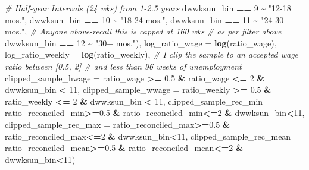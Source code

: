 \documentclass[
]{article}
\newenvironment{Shaded}{\begin{snugshade}}{\end{snugshade}}
\newcommand{\AttributeTok}[1]{\textcolor[rgb]{0.13,0.29,0.53}{#1}}
\newcommand{\CommentTok}[1]{\textcolor[rgb]{0.56,0.35,0.01}{\textit{#1}}}
\newcommand{\DecValTok}[1]{\textcolor[rgb]{0.00,0.00,0.81}{#1}}
\newcommand{\FloatTok}[1]{\textcolor[rgb]{0.00,0.00,0.81}{#1}}
\newcommand{\FunctionTok}[1]{\textcolor[rgb]{0.13,0.29,0.53}{\textbf{#1}}}
\newcommand{\NormalTok}[1]{#1}
\newcommand{\SpecialCharTok}[1]{\textcolor[rgb]{0.81,0.36,0.00}{\textbf{#1}}}
\newcommand{\StringTok}[1]{\textcolor[rgb]{0.31,0.60,0.02}{#1}}
\begin{document}
\begin{Shaded}
\begin{Highlighting}[]
                                 \CommentTok{\# Half{-}year Intervals (24 wks) from 1{-}2.5 years}
\NormalTok{                                 dwwksun\_bin }\SpecialCharTok{==} \DecValTok{9} \SpecialCharTok{\textasciitilde{}} \StringTok{"12{-}18 mos."}\NormalTok{, }
\NormalTok{                                 dwwksun\_bin }\SpecialCharTok{==} \DecValTok{10} \SpecialCharTok{\textasciitilde{}} \StringTok{"18{-}24 mos."}\NormalTok{, }
\NormalTok{                                 dwwksun\_bin }\SpecialCharTok{==} \DecValTok{11} \SpecialCharTok{\textasciitilde{}} \StringTok{"24{-}30 mos."}\NormalTok{, }
                                 \CommentTok{\# Anyone above{-}recall this is capped at 160 wks}
                                 \CommentTok{\# as per filter above}
\NormalTok{                                 dwwksun\_bin }\SpecialCharTok{==} \DecValTok{12} \SpecialCharTok{\textasciitilde{}} \StringTok{"30+ mos."}\NormalTok{),}
         \AttributeTok{log\_ratio\_wage =} \FunctionTok{log}\NormalTok{(ratio\_wage),}
         \AttributeTok{log\_ratio\_weekly =} \FunctionTok{log}\NormalTok{(ratio\_weekly),}
         \CommentTok{\# I clip the sample to an accepted wage ratio between [0.5, 2] }
         \CommentTok{\# and less than 96 weeks of unemployment}
         \AttributeTok{clipped\_sample\_hwage =} 
\NormalTok{           ratio\_wage }\SpecialCharTok{\textgreater{}=} \FloatTok{0.5} \SpecialCharTok{\&}\NormalTok{ ratio\_wage }\SpecialCharTok{\textless{}=} \DecValTok{2} \SpecialCharTok{\&}\NormalTok{ dwwksun\_bin }\SpecialCharTok{\textless{}} \DecValTok{11}\NormalTok{,}
         \AttributeTok{clipped\_sample\_wwage =} 
\NormalTok{           ratio\_weekly }\SpecialCharTok{\textgreater{}=} \FloatTok{0.5} \SpecialCharTok{\&}\NormalTok{ ratio\_weekly }\SpecialCharTok{\textless{}=} \DecValTok{2}  \SpecialCharTok{\&}\NormalTok{ dwwksun\_bin }\SpecialCharTok{\textless{}} \DecValTok{11}\NormalTok{,}
         \AttributeTok{clipped\_sample\_rec\_min =} 
\NormalTok{           ratio\_reconciled\_min}\SpecialCharTok{\textgreater{}=}\FloatTok{0.5} \SpecialCharTok{\&}\NormalTok{ ratio\_reconciled\_min}\SpecialCharTok{\textless{}=}\DecValTok{2} \SpecialCharTok{\&}\NormalTok{ dwwksun\_bin}\SpecialCharTok{\textless{}}\DecValTok{11}\NormalTok{,}
         \AttributeTok{clipped\_sample\_rec\_max =} 
\NormalTok{           ratio\_reconciled\_max}\SpecialCharTok{\textgreater{}=}\FloatTok{0.5} \SpecialCharTok{\&}\NormalTok{ ratio\_reconciled\_max}\SpecialCharTok{\textless{}=}\DecValTok{2} \SpecialCharTok{\&}\NormalTok{ dwwksun\_bin}\SpecialCharTok{\textless{}}\DecValTok{11}\NormalTok{,}
         \AttributeTok{clipped\_sample\_rec\_mean =} 
\NormalTok{           ratio\_reconciled\_mean}\SpecialCharTok{\textgreater{}=}\FloatTok{0.5} \SpecialCharTok{\&}\NormalTok{ ratio\_reconciled\_mean}\SpecialCharTok{\textless{}=}\DecValTok{2} \SpecialCharTok{\&}\NormalTok{ dwwksun\_bin}\SpecialCharTok{\textless{}}\DecValTok{11}\NormalTok{)}
\end{Highlighting}
\end{Shaded}
\end{document}
